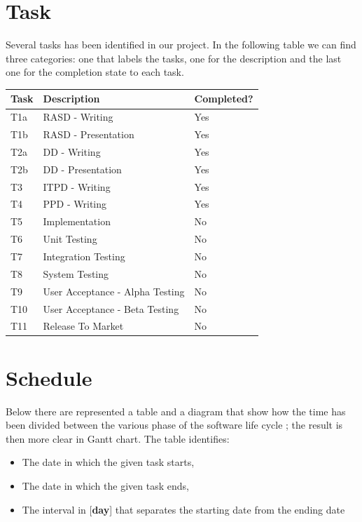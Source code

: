 \section{Task}
Several tasks has been identified in our project. In the following table we can find three categories: one that labels the tasks, one for the description and the last one for the completion state to each task.

\begin{center}
	\begin{tabulary}{\linewidth\tymin=70pt}{Y{2cm}|Y{6cm}|Y{2.25cm}}
		\textbf{Task} & \textbf{Description} & \textbf{Completed?}\\ \hline
		T1a & RASD - Writing & Yes \\ \hline
		T1b & RASD - Presentation & Yes \\ \hline
		T2a & DD - Writing & Yes \\ \hline
		T2b & DD - Presentation & Yes \\ \hline
		T3 & ITPD - Writing & Yes \\ \hline
		T4 & PPD - Writing & Yes \\ \hline
		T5 & Implementation & No \\ \hline
		T6 & Unit Testing & No \\ \hline
		T7 & Integration Testing & No \\ \hline
		T8 & System Testing & No \\ \hline
		T9 & User Acceptance - Alpha Testing & No \\ \hline
		T10 & User Acceptance - Beta Testing & No \\ \hline
		T11 & Release To Market & No \\
	\end{tabulary}
\end{center}

\section{Schedule}
Below there are represented a table and a diagram that show how the time has been divided between the various phase of the software life cycle ; the result is then more clear in Gantt chart.
The table identifies:

\begin{itemize}
  \item The date in which the given task starts,
  \item The date in which the given task ends,
  \item The interval in [\textbf{day}] that separates the starting date from the ending date
\end{itemize}

